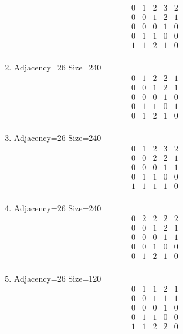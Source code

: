 \documentclass[12pt]{article}
\begin{document}
\begin{multicols}{3}
\begin{enumerate}
\begin{equation*}
\begin{array}{ccccc}
0&1&2&3&2\\
0&0&1&2&1\\
0&0&0&1&0\\
0&1&1&0&0\\
1&1&2&1&0\\
\end{array}
\end{equation*}
\item Adjacency=26 Size=240
\begin{equation*}
\begin{array}{ccccc}
0&1&2&2&1\\
0&0&1&2&1\\
0&0&0&1&0\\
0&1&1&0&1\\
0&1&2&1&0\\
\end{array}
\end{equation*}
\item Adjacency=26 Size=240
\begin{equation*}
\begin{array}{ccccc}
0&1&2&3&2\\
0&0&2&2&1\\
0&0&0&1&1\\
0&1&1&0&0\\
1&1&1&1&0\\
\end{array}
\end{equation*}
\item Adjacency=26 Size=240
\begin{equation*}
\begin{array}{ccccc}
0&2&2&2&2\\
0&0&1&2&1\\
0&0&0&1&1\\
0&0&1&0&0\\
0&1&2&1&0\\
\end{array}
\end{equation*}
\item Adjacency=26 Size=120
\begin{equation*}
\begin{array}{ccccc}
0&1&1&2&1\\
0&0&1&1&1\\
0&0&0&1&0\\
0&1&1&0&0\\
1&1&2&2&0\\
\end{array}

\end{equation*}
\end{enumerate}
\end{multicols}
\end{document}
